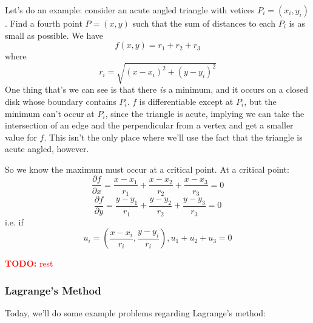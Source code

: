 \documentclass{article}
\newcommand{\prt}[2]{\frac{\partial #1}{\partial #2}}
\newcommand{\TODO}[1]{\textcolor{red}{\textbf{TODO:} #1}}
\begin{document}
Let's do an example: consider an acute angled triangle with vetices \(P_i = (x_i, y_i)\). Find a fourth point \(P = (x, y)\) such that the sum of distances to each \(P_i\) is as small as possible. We have
\begin{equation}f(x, y) = r_1 + r_2 + r_3\end{equation}
where
\begin{equation}r_i = \sqrt{(x - x_i)^2 + (y - y_i)^2}\end{equation}
One thing that's we can see is that there \textit{is} a minimum, and it occurs on a closed disk whose boundary contains \(P_i\). \(f\) is differentiable except at \(P_i\), but the minimum can't occur at \(P_i\), since the triangle is acute, implying we can take the intersection of an edge and the perpendicular from a vertex and get a smaller value for \(f\). This isn't the only place where we'll use the fact that the triangle is acute angled, however.

So we know the maximum must occur at a critical point. At a critical point:
\begin{equation}\prt{f}{x} = \frac{x - x_1}{r_1} + \frac{x - x_2}{r_2} + \frac{x - x_3}{r_3} = 0\end{equation}
\begin{equation}\prt{f}{y} = \frac{y - y_1}{r_1} + \frac{y - y_2}{r_2} + \frac{y - y_3}{r_3} = 0\end{equation}
i.e. if
\begin{equation}u_i = \left(\frac{x - x_i}{r_i}, \frac{y - y_i}{r_i}\right), u_1 + u_2 + u_3 = 0\end{equation}

\TODO{rest}

\subsubsection{Lagrange's Method}


Today, we'll do some example problems regarding Lagrange's method:
\end{document}
